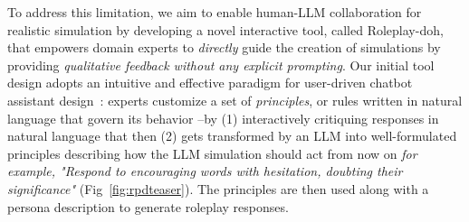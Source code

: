 \documentclass[11pt]{article}
\newcommand{\ryan}[1]{\ifthenelse{\boolean{showcomments}}{\textcolor{orange}{[#1 —ryan]}}{}}
\newcommand{\raj}[1]{\ifthenelse{\boolean{showcomments}}{\textcolor{purple}{[#1 —raj]}}{}}
\begin{document}
To address this limitation, we aim to enable human-LLM collaboration for realistic simulation by developing a novel interactive tool, called Roleplay-doh, that empowers domain experts to \textit{directly} guide the creation of simulations by providing \textit{qualitative feedback without any explicit prompting}. 
Our initial tool design adopts an intuitive and effective paradigm for user-driven chatbot assistant design~\cite{petridis2023constitutionmaker}: experts customize a set of \textit{principles}, or rules written in natural language that govern its behavior \cite{bai2022constitutional}--by (1) interactively critiquing responses in natural language that then (2) gets transformed by an LLM into well-formulated principles describing how the LLM simulation should act from now on \textit{for example, "Respond to encouraging words with hesitation, doubting their significance"} (Fig~\ref{fig:rpdteaser}). The principles are then used along with a persona description to generate roleplay responses. 
\end{document}

